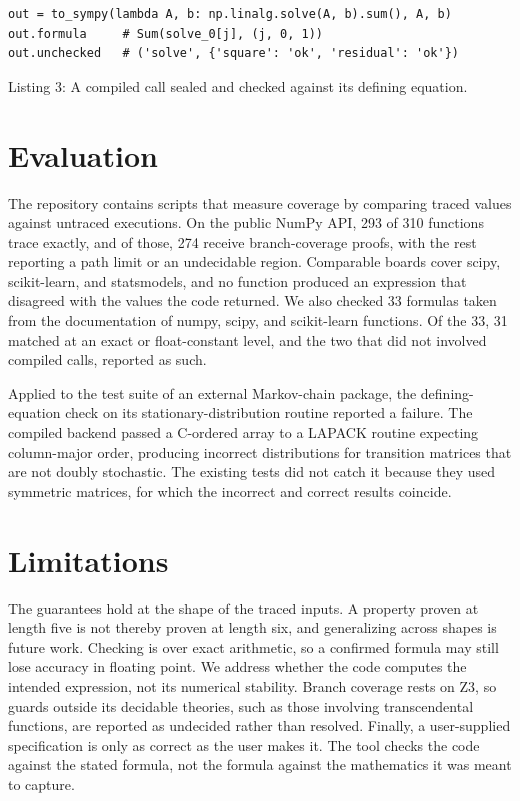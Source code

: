 \documentclass[twoside,11pt]{article}
\begin{document}
\begin{verbatim}
out = to_sympy(lambda A, b: np.linalg.solve(A, b).sum(), A, b)
out.formula     # Sum(solve_0[j], (j, 0, 1))
out.unchecked   # ('solve', {'square': 'ok', 'residual': 'ok'})
\end{verbatim}
\vskip -0.05in
\centerline{\small Listing 3: A compiled call sealed and checked
against its defining equation.}
\vskip 0.05in

\section{Evaluation}

The repository contains scripts that measure coverage by comparing
traced values against untraced executions. On the public NumPy API, 293
of 310 functions trace exactly, and of those, 274 receive
branch-coverage proofs, with the rest reporting a path limit or an
undecidable region. Comparable boards cover scipy, scikit-learn, and
statsmodels, and no function produced an expression that disagreed with
the values the code returned. We also checked 33 formulas taken from
the documentation of numpy, scipy, and scikit-learn functions. Of the
33, 31 matched at an exact or float-constant level, and the two that did
not involved compiled calls, reported as such.

Applied to the test suite of an external Markov-chain package, the
defining-equation check on its stationary-distribution routine reported
a failure. The compiled backend passed a C-ordered array to a LAPACK
routine expecting column-major order, producing incorrect distributions
for transition matrices that are not doubly stochastic. The existing
tests did not catch it because they used symmetric matrices, for which
the incorrect and correct results coincide.

\section{Limitations}

The guarantees hold at the shape of the traced inputs. A property
proven at length five is not thereby proven at length six, and
generalizing across shapes is future work. Checking is over exact
arithmetic, so a confirmed formula may still lose accuracy in floating
point. We address whether the code computes the intended expression,
not its numerical stability. Branch coverage rests on Z3, so guards
outside its decidable theories, such as those involving transcendental
functions, are reported as undecided rather than resolved. Finally, a
user-supplied specification is only as correct as the user makes it.
The tool checks the code against the stated formula, not the formula
against the mathematics it was meant to capture.
\end{document}
